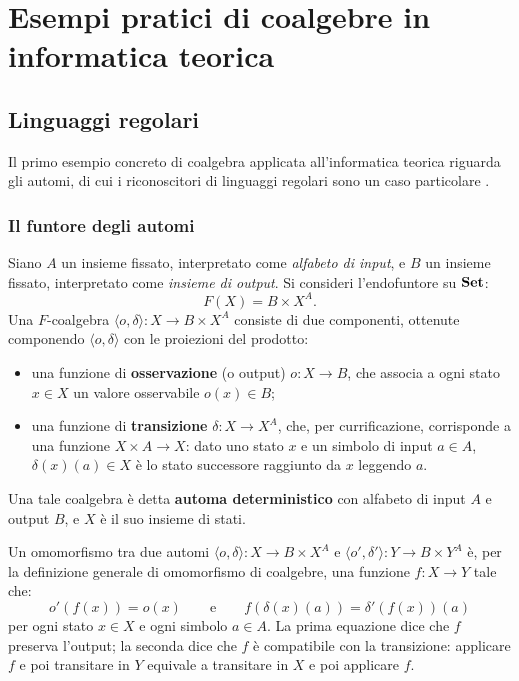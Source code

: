 \chapter{Esempi pratici di coalgebre in informatica teorica}

\section{Linguaggi regolari}

Il primo esempio concreto di coalgebra applicata all'informatica teorica riguarda gli automi, di cui i riconoscitori di linguaggi regolari sono un caso particolare \cite{jacobs2017}.

\subsection{Il funtore degli automi}

Siano \(A\) un insieme fissato, interpretato come \textit{alfabeto di input}, e \(B\) un insieme fissato, interpretato come \textit{insieme di output}. Si consideri l'endofuntore su \(\operatorname{\mathbf{Set}}\):
\[
  F(X) = B \times X^A.
\]
Una \(F\)-coalgebra \(\langle o, \delta \rangle : X \to B \times X^A\) consiste di due componenti, ottenute componendo \(\langle o, \delta \rangle\) con le proiezioni del prodotto:
\begin{itemize}
  \item una funzione di \textbf{osservazione} (o output) \(o : X \to B\), che associa a ogni stato \(x \in X\) un valore osservabile \(o(x) \in B\);
  \item una funzione di \textbf{transizione} \(\delta : X \to X^A\), che, per currificazione, corrisponde a una funzione \(X \times A \to X\): dato uno stato \(x\) e un simbolo di input \(a \in A\), \(\delta(x)(a) \in X\) è lo stato successore raggiunto da \(x\) leggendo \(a\).
\end{itemize}
Una tale coalgebra è detta \textbf{automa deterministico} con alfabeto di input \(A\) e output \(B\), e \(X\) è il suo insieme di stati.

Un omomorfismo tra due automi \(\langle o, \delta \rangle : X \to B \times X^A\) e \(\langle o', \delta' \rangle : Y \to B \times Y^A\) è, per la definizione generale di omomorfismo di coalgebre, una funzione \(f : X \to Y\) tale che:
\[
  o'(f(x)) = o(x) \qquad \text{e} \qquad f(\delta(x)(a)) = \delta'(f(x))(a)
\]
per ogni stato \(x \in X\) e ogni simbolo \(a \in A\). La prima equazione dice che \(f\) preserva l'output; la seconda dice che \(f\) è compatibile con la transizione: applicare \(f\) e poi transitare in \(Y\) equivale a transitare in \(X\) e poi applicare \(f\).

